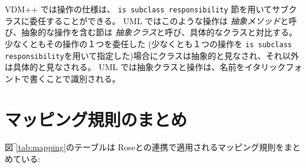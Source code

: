 \documentclass[\pformat,12pt]{jarticle}
\newcommand{\vdmpp}{VDM++}
\newcommand{\link}{Roseとの連携}
\begin{document}
 \vdmpp{} では操作の仕様は、 {\tt is subclass responsibility} 節を用いてサブクラスに委任することができる。
UML ではこのような操作は {\it 抽象メソッド}と呼び、抽象的な操作を含む節は {\it 抽象クラス}と呼び、具体的なクラスと対比する。
少なくともその操作の１つを委任した (少なくとも１つの操作を {\tt is subclass responsibility}を用いて指定した)場合にクラスは抽象的と見なされ、それ以外は具体的と見なされる。
 UML では抽象クラスと操作は、名前をイタリックフォントで書くことで識別される。


\newpage
  
  
\newpage
\appendix
\section{マッピング規則のまとめ} \label{rules}
図‾\ref{tab:mapping}のテーブルは \link{}で適用されるマッピング規則をまとめている:  
\end{document}
